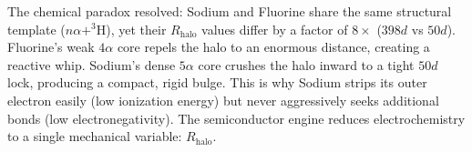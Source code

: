 The chemical paradox resolved: Sodium and Fluorine share the same structural template ($n\alpha + ^3\text{H}$), yet their $R_{\text{halo}}$ values differ by a factor of $8\times$ ($398d$ vs $50d$). Fluorine's weak $4\alpha$ core repels the halo to an enormous distance, creating a reactive whip. Sodium's dense $5\alpha$ core crushes the halo inward to a tight $50d$ lock, producing a compact, rigid bulge. This is why Sodium strips its outer electron easily (low ionization energy) but never aggressively seeks additional bonds (low electronegativity). The semiconductor engine reduces electrochemistry to a single mechanical variable: $R_{\text{halo}}$.

